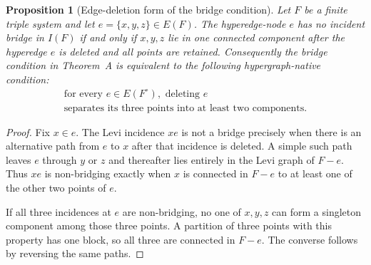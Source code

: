 \documentclass[a4paper,11pt,reqno]{amsart}
\theoremstyle{plain}
\newtheorem{proposition}[theorem]{Proposition}
\theoremstyle{definition}
\theoremstyle{remark}
\begin{document}
\begin{proposition}[Edge-deletion form of the bridge condition]
\label{proposition-edge-deletion-bridge-condition}
Let $F$ be a finite triple system and let $e=\{x,y,z\}\in E(F)$.  The
hyperedge-node $e$ has no incident bridge in $I(F)$ if and only if $x,y,z$
lie in one connected component after the hyperedge $e$ is deleted and all
points are retained.  Consequently the bridge condition in Theorem~A is
equivalent to the following hypergraph-native condition:
\[
\begin{gathered}
\text{for every }e\in E(F^\circ),\text{ deleting }e\\
\text{separates its three points into at least two components.}
\end{gathered}
\]
\end{proposition}
\begin{proof}
Fix $x\in e$.  The Levi incidence $xe$ is not a bridge precisely when there
is an alternative path from $e$ to $x$ after that incidence is deleted.  A
simple such path leaves $e$ through $y$ or $z$ and thereafter lies entirely
in the Levi graph of $F-e$.  Thus $xe$ is non-bridging exactly when $x$ is
connected in $F-e$ to at least one of the other two points of $e$.

If all three incidences at $e$ are non-bridging, no one of $x,y,z$ can form a
singleton component among those three points.  A partition of three points
with this property has one block, so all three are connected in $F-e$.  The
converse follows by reversing the same paths.
\end{proof}
\end{document}
